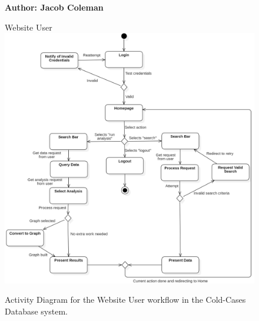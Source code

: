 \documentclass[11pt]{article}
\begin{document}
\begin{figure}[!ht]
\centering
\textbf{Author: Jacob Coleman}
\vspace*{1em}

Website User
	\includegraphics[width=.95\textwidth]{./Activity Diagram/activitydiagram_jardee_2}\\
	\caption{Activity Diagram for the Website User workflow in the Cold-Cases Database system.}
	\label{fig:activity_diagram}
\end{figure}
\end{document}
